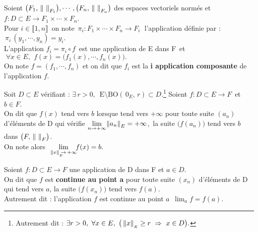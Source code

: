 \vspace{1.7cm}

Soient \(\bigl(F_1,\, \norm{\ }_{F_1}\bigr),\cdots, \bigl(F_n,\, \norm{\ }_{F_n}\bigr)\) des espaces vectoriels normés et \(f:D\subset E \to F_1\times\cdots\times F_n\).\vspace{0.1cm}\\
Pour \(i\in \llbracket 1,n \rrbracket\,\) on note \(\,\pi_i : F_1\times\cdots\times F_n \to F_i\;\) l'application définie par : \(\,\pi_i\,(y_1,\cdots,y_n)=y_i\).\vspace{0.2cm}\\
L'application \(f_i=\pi_i\circ f\,\) est une application de E dans F\, et \(\;\forall x\in E,\ \,f(x)=\bigl(f_1(x),\cdots,f_n(x)\bigr).\)\vspace{0.1cm}\\
On note \(f=(f_1,\cdots,f_n)\) et on dit que $f_i$ est la \textbf{i application composante} de l'application $f$.

\vspace{1.8cm}

Soit $D\subset E$ vérifiant : \(\exists\, r>0,\ \; \text{E}\setminus\text{BO}(\,0_E,\,r)\subset D.\)\footnote{Autrement dit : \(\exists r>0,\ \forall x\in E,\ \bigl(\,\norm{x}_{_E}\geq r \ \Rightarrow \ x\in D\bigr).\)}\; Soient \(f:D\subset E\to F\, \) et $b\in F$.\vspace{0.2cm}\\
On dit que $f(x)$ tend vers $b$ lorsque  tend vers $+\infty$ \ssi pour toute suite $(a_n)$\vspace{0.1cm}\\
d'éléments de D qui vérifie \(\displaystyle \lim_{n\to +\infty}\! \left\lVert a_n\right\rVert_E=+\infty\),\, la suite \( \bigl( f(a_n) \bigr) \) tend vers $b$ dans \(\bigl(F,\, \norm{\ }_F\bigr)\).\vspace{0.3cm}\\
On note alors \(\ \displaystyle \lim_{\left\lVert x\right\rVert_{_E}\!\!\!\to \,+\infty}\!\!f(x) = b.\)

\newpage

Soient \(f:D\subset E\to F\) une application de D dans F et \underline{\(a\in D\)}.\vspace{0.1cm}\\
On dit que $f$ est \textbf{continue au point a} \ssi pour toute suite \((x_n)\) d'éléments de D qui tend vers $a$, la suite \(\bigl(f(x_n)\bigr)\) tend vers $f(a)$.\vspace{0.1cm}\\
Autrement dit : l'application $f$ est continue au point $a$ \ssi \(\,\displaystyle \lim_af=f(a).\)

